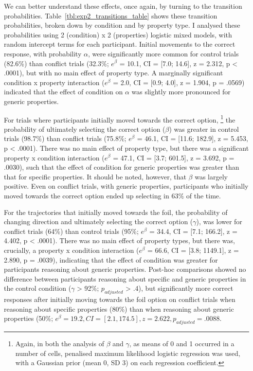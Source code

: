 We can better understand these effects, once again,
by turning to the transition probabilities.
Table~\ref{tbl:exp2_transitions_table} shows
these transition probabilities,
broken down by condition and by property type.
I analysed these probabilities
using 2 (condition) x 2 (properties) logistic mixed models,
with random intercept terms for each participant.
Initial movements to the correct response,
with probability $\alpha$, were significantly more common for control trials (82.6\%)
than conflict trials (32.3\%;
$e^{\beta}$ = 10.1, CI = [7.0; 14.6], z = 2.312, p < .0001),
but with no main effect of property type.
A marginally significant condition x property interaction
($e^{\beta}$ = 2.0, CI = [0.9; 4.0], z = 1.904, p = .0569)
indicated that the effect of condition on $\alpha$
was slightly more pronounced for generic properties.

For trials where participants initially moved towards the correct option,%
\footnote{
  Again, in both the analysis of $\beta$ and $\gamma$,
  as means of 0 and 1 occurred in a number of cells,
  penalised maximum likelihood logistic regression was used,
  with a Gaussian prior (mean 0, SD 3) on each regression coefficient.
  }
the probability of ultimately selecting the correct option ($\beta$)
was greater in control trials (98.7\%) than conflict trials (75.8\%;
$e^{\beta}$ = 46.1, CI = [11.6; 182.9], z = 5.453, p < .0001).
There was no main effect of property type,
but there was a significant property x condition interaction
($e^{\beta}$ = 47.1, CI = [3.7; 601.5], z = 3.692, p = .0030),
such that the effect of condition for generic properties
was greater than that for specific properties.
It should be noted, however, that $\beta$ was largely positive.
Even on conflict trials, with generic properties,
participants who initially moved towards the correct option
ended up selecting in 63\% of the time.

For the trajectories that initially moved towards the foil,
the probability of changing direction and ultimately selecting the correct option ($\gamma$),
was lower for conflict trials (64\%)
than control trials (95\%;
$e^{\beta}$ = 34.4, CI = [7.1; 166.2], z = 4.402, p < .0001).
There was no main effect of property types, but
there was, crucially, a property x condition interaction
($e^{\beta}$ = 66.6, CI = [3.8; 1149.1], z = 2.890, p = .0039),
indicating that the effect of condition was greater
for participants reasoning about generic properties.
Post-hoc comparisons showed no difference
between participants reasoning about specific and generic properties
in the control condition ($\gamma$ > 92\%; $p_{adjusted}$ > .4),
but significantly more correct responses
after initially moving towards the foil option on conflict trials
when reasoning about specific properties (80\%)
than when reasoning about generic properties (50\%;
$e^{\beta} = 19.2, CI = [2.1, 174.5], z = 2.622, p_{adjusted} = .0088$.






